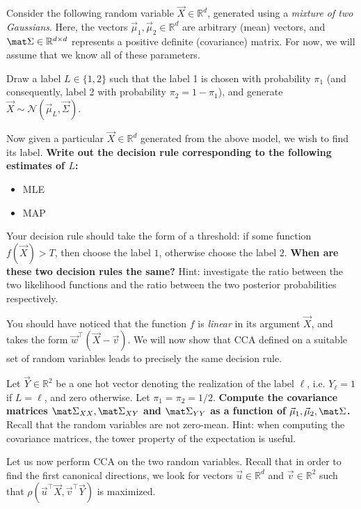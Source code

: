 \documentclass[preview]{standalone}
\begin{document}

Consider the following random variable $\vec X \in \mathbb{R}^d$, generated using a \emph{mixture of two Gaussians}. Here, the vectors $\vec \mu_1, \vec \mu_2 \in \mathbb{R}^d$ are arbitrary (mean) vectors, and $\mat \Sigma \in \mathbb{R}^{d \times d}$ represents a positive definite (covariance) matrix. For now, we will assume that we know all of these parameters.

Draw a label $L \in \{1, 2\}$ such that the label 1 is chosen with probability $\pi_1$ (and consequently, label 2 with probability $\pi_2 = 1 - \pi_1$), and generate $\vec X \sim \mathcal{N}(\vec \mu_{L}, \vec \Sigma)$.
\begin{Parts}

\Part Now given a particular $\vec X \in \mathbb{R}^d$ generated from the above model, we wish to find its label. {\bf Write out the decision rule corresponding to the following estimates of $L$:}
\begin{itemize}
\item MLE
\item MAP
\end{itemize}

Your decision rule should take the form of a threshold: if some function $f(\vec X) > T$, then choose the label $1$, otherwise choose the label $2$.
{\bf When are these two decision rules the same?} Hint: investigate the ratio between the two likelihood functions and the ratio between the two posterior probabilities respectively.



\Part You should have noticed that the function $f$ is \emph{linear} in its argument $\vec X$, and takes the form $\vec w^\top (\vec X - \vec v)$. We will now show that CCA defined on a suitable set of random variables leads to precisely the same decision rule.

Let $\vec Y \in \mathbb{R}^2$ be a one hot vector denoting the realization of the label $\ell$, i.e. $Y_\ell = 1$ if $L = \ell$, and zero otherwise.
Let $\pi_1 = \pi_2 = 1/2$. {\bf Compute the covariance matrices $\mat \Sigma_{XX}, \mat \Sigma_{XY}$ and $\mat \Sigma_{YY}$ as a function of $\vec \mu_1, \vec \mu_2, \mat \Sigma$.} Recall that the random variables are not zero-mean. Hint: when computing the covariance matrices, the tower property of the expectation is useful.



\Part Let us now perform CCA on the two random variables. Recall that in order to find the first canonical directions, we look for vectors $\vec u \in \mathbb{R}^d$ and $\vec v \in \mathbb{R}^2$ such that $\rho(\vec u^\top \vec X, \vec v^\top \vec Y)$ is maximized.


\end{Parts}
\end{document}
